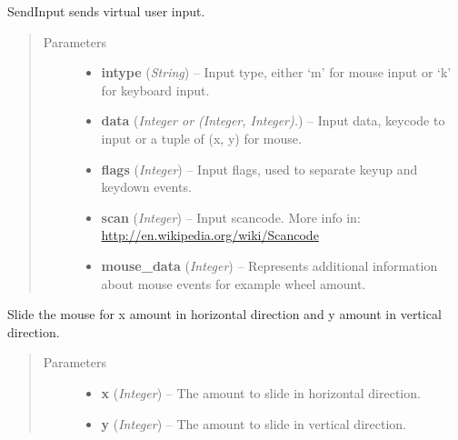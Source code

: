 \documentclass[letterpaper,10pt,english]{sphinxmanual}
\begin{document}

\begin{fulllineitems}
\label{macro:macro.SendInput}
SendInput sends virtual user input.
\begin{quote}\begin{description}
\item[{Parameters}] \leavevmode\begin{itemize}
\item {} 
\textbf{intype} (\emph{String}) -- Input type, either `m' for mouse input or `k' for                   keyboard input.

\item {} 
\textbf{data} (\emph{Integer or (Integer, Integer).}) -- Input data, keycode to input or a tuple of (x, y) for mouse.

\item {} 
\textbf{flags} (\emph{Integer}) -- Input flags, used to separate keyup and keydown events.

\item {} 
\textbf{scan} (\emph{Integer}) -- Input scancode. More info in:                 \href{http://en.wikipedia.org/wiki/Scancode}{http://en.wikipedia.org/wiki/Scancode}

\item {} 
\textbf{mouse\_data} (\emph{Integer}) -- Represents additional information about mouse events                       for example wheel amount.

\end{itemize}

\end{description}\end{quote}

\end{fulllineitems}


\begin{fulllineitems}
\label{macro:macro.Slide}
Slide the mouse for x amount in horizontal direction and y amount in
vertical direction.
\begin{quote}\begin{description}
\item[{Parameters}] \leavevmode\begin{itemize}
\item {} 
\textbf{x} (\emph{Integer}) -- The amount to slide in horizontal direction.

\item {} 
\textbf{y} (\emph{Integer}) -- The amount to slide in vertical direction.

\end{itemize}

\end{description}\end{quote}

\end{fulllineitems}
\end{document}
